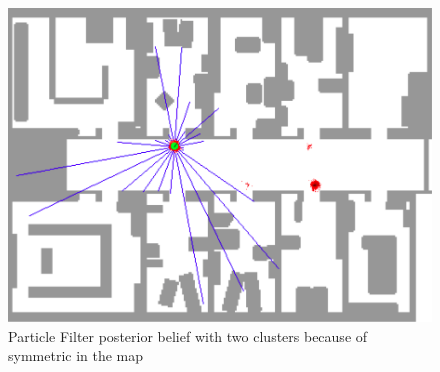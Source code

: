 \begin{figure}[H]
\centering
\includegraphics[scale=0.45]{images/particlefilter3}
\caption{Particle Filter posterior belief with two clusters because of symmetric in the map}
\label{fig:pf_ex3}
\end{figure}